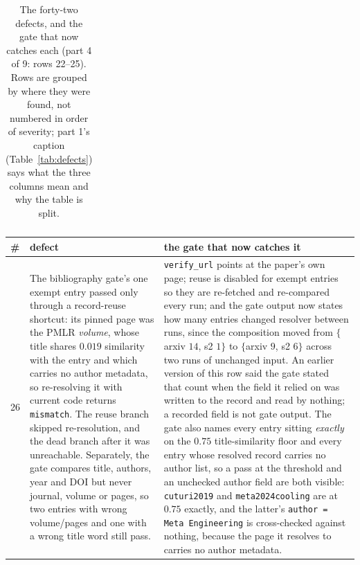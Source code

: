 \documentclass{article}
\begin{document}
\begin{table}[p]
\begin{tabular}{@{}p{0.6cm}p{7.3cm}p{7.3cm}@{}}
\bottomrule
\end{tabular}
\caption{The forty-two defects, and the gate that now catches each (part 4 of 9: rows 22--25).  Rows are grouped by where they were found, not numbered in order of severity; part 1's caption (Table~\ref{tab:defects}) says what the three columns mean and why the table is split.}
\label{tab:defectsd}
\end{table}

\begin{table}[p]
\centering
\small\sloppy
\setlength{\tabcolsep}{4pt}
\begin{tabular}{@{}p{0.6cm}p{7.3cm}p{7.3cm}@{}}
\toprule
\# & defect & the gate that now catches it \\
\midrule
26 & The bibliography gate's one exempt entry passed only through a record-reuse shortcut: its pinned page was the PMLR \emph{volume}, whose title shares $0.019$ similarity with the entry and which carries no author metadata, so re-resolving it with current code returns \texttt{mismatch}.  The reuse branch skipped re-resolution, and the dead branch after it was unreachable.  Separately, the gate compares title, authors, year and DOI but never journal, volume or pages, so two entries with wrong volume/pages and one with a wrong title word still pass. & \texttt{verify\_url} points at the paper's own page; reuse is disabled for exempt entries so they are re-fetched and re-compared every run; and the gate output now states how many entries changed resolver between runs, since the composition moved from $\{$arxiv $14$, s2 $1\}$ to $\{$arxiv $9$, s2 $6\}$ across two runs of unchanged input.  An earlier version of this row said the gate stated that count when the field it relied on was written to the record and read by nothing; a recorded field is not gate output.  The gate also names every entry sitting \emph{exactly} on the $0.75$ title-similarity floor and every entry whose resolved record carries no author list, so a pass at the threshold and an unchecked author field are both visible: \texttt{cuturi2019} and \texttt{meta2024cooling} are at $0.75$ exactly, and the latter's \texttt{author = Meta Engineering} is cross-checked against nothing, because the page it resolves to carries no author metadata. \\

\end{tabular}
\end{table}
\end{document}
